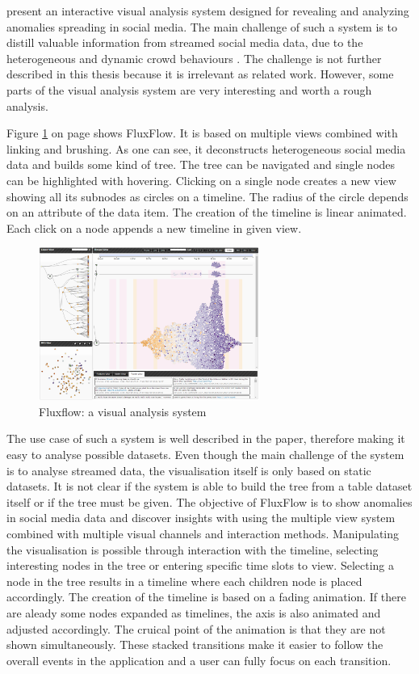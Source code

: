 \citeauthor{Zhao2014} present an interactive visual analysis system designed for revealing and analyzing anomalies spreading in social media. The main challenge of such a system is to distill valuable information from streamed social media data, due to the heterogeneous and dynamic crowd behaviours . The challenge is not further described in this thesis because it is irrelevant as related work. However, some parts of the visual analysis system are very interesting and worth a rough analysis.

Figure \ref{fig:fluxflow} on page \pageref{fig:fluxflow} shows FluxFlow. It is based on multiple views combined with linking and brushing. As one can see, it deconstructs heterogeneous social media data and builds some kind of tree. The tree can be navigated and single nodes can be highlighted with hovering. Clicking on a single node creates a new view showing all its subnodes as circles on a timeline. The radius of the circle depends on an attribute of the data item. The creation of the timeline is linear animated. Each click on a node appends a new timeline in given view.

\begin{figure}[!htb]
\centering
\includegraphics[height=5cm]{images/methods/related/fluxflow.png}
\caption[
    Fluxflow: a visual analysis system .
]{Fluxflow: a visual analysis system}
\label{fig:fluxflow}
\end{figure}

The use case of such a system is well described in the paper, therefore making it easy to analyse possible datasets. Even though the main challenge of the system is to analyse streamed data, the visualisation itself is only based on static datasets. It is not clear if the system is able to build the tree from a table dataset itself or if the tree must be given.
\cbstart
The objective of FluxFlow is to show anomalies in social media data and discover insights with using the multiple view system combined with multiple visual channels and interaction methods. Manipulating the visualisation is possible through interaction with the timeline, selecting interesting nodes in the tree or entering specific time slots to view. Selecting a node in the tree results in a timeline where each children node is placed accordingly. The creation of the timeline is based on a fading animation. If there are aleady some nodes expanded as timelines, the axis is also animated and adjusted accordingly. The cruical point of the animation is that they are not shown simultaneously. These stacked transitions make it easier to follow the overall events in the application and a user can fully focus on each transition.
\cbend